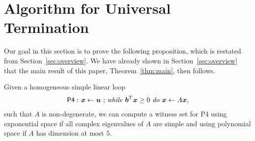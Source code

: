 \section{Algorithm for Universal Termination}
Our goal in this section is to prove the following proposition, which
is restated from Section~\ref{sec:overview}.  We have already shown in
Section~\ref{sec:overview} that the main result of this paper,
Theorem~\ref{thm:main}, then follows.

\begin{proposition}
Given a homogeneous simple linear loop
\begin{gather*}
\mathsf{P4:}\ \mbox{$\boldsymbol{x}\gets \boldsymbol{u}$ ;
\textit{while} $\boldsymbol{b}^T\boldsymbol{x} \geq 0$ \textit{do} $\boldsymbol{x}\leftarrow A\boldsymbol{x}$,}
\end{gather*}
such that $A$ is non-degenerate, we can compute a
witness set for \textsf{P4} using exponential space if all complex eigenvalues of $A$ are simple and using polynomial space if $A$ has dimension at most $5$.
\label{prop:main2}
\end{proposition}


